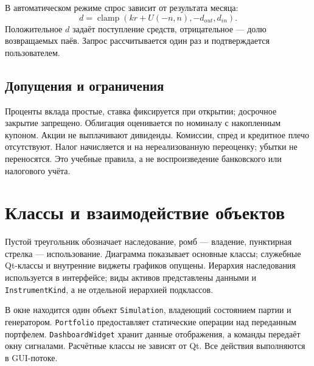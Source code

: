 \documentclass[11pt,a4paper]{article}
\newcommand{\code}[1]{\texttt{#1}}
\begin{document}
В автоматическом режиме спрос зависит от результата месяца:
\[
 d=\operatorname{clamp}(kr+U(-n,n),-d_{out},d_{in}).
\]
Положительное $d$ задаёт поступление средств, отрицательное --- долю возвращаемых паёв. Запрос рассчитывается один раз и подтверждается пользователем.

\subsection*{Допущения и ограничения}
Проценты вклада простые, ставка фиксируется при открытии; досрочное закрытие запрещено. Облигация оценивается по номиналу с накопленным купоном. Акции не выплачивают дивиденды. Комиссии, спред и кредитное плечо отсутствуют. Налог начисляется и на нереализованную переоценку; убытки не переносятся. Это учебные правила, а не воспроизведение банковского или налогового учёта.

\newpage
\section{Классы и взаимодействие объектов}
\begin{center}
\end{center}
Пустой треугольник обозначает наследование, ромб --- владение, пунктирная стрелка --- использование. Диаграмма показывает основные классы; служебные Qt-классы и внутренние виджеты графиков опущены. Иерархия наследования используется в интерфейсе; виды активов представлены данными и \code{InstrumentKind}, а не отдельной иерархией подклассов.

В окне находится один объект \code{Simulation}, владеющий состоянием партии и генератором. \code{Portfolio} предоставляет статические операции над переданным портфелем. \code{DashboardWidget} хранит данные отображения, а команды передаёт окну сигналами. Расчётные классы не зависят от Qt. Все действия выполняются в GUI-потоке.
\end{document}
